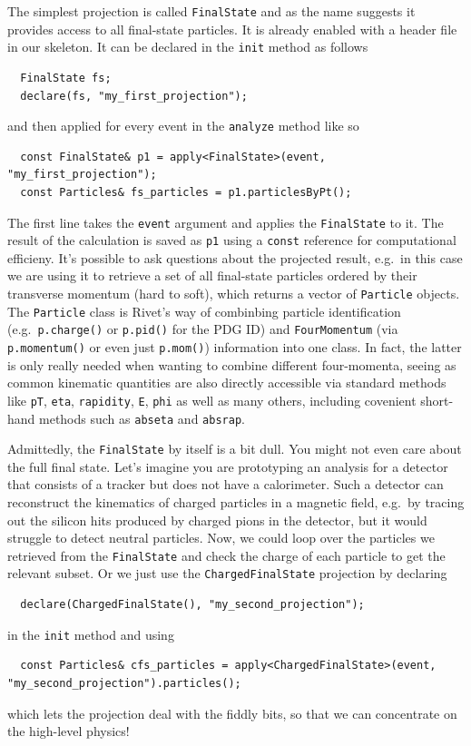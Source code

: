 \documentclass[10pt,fleqn]{scrartcl}
\theoremstyle{exstyle}
\begin{document}
The simplest projection is called
\verb|FinalState| and as the name suggests
it provides access to all final-state particles.
It is already enabled with a header file in our skeleton.
It can be declared in the \verb|init| method as follows
\begin{verbatim}
  FinalState fs;
  declare(fs, "my_first_projection");
\end{verbatim}
and then applied for every event in the \verb|analyze|
method like so
\begin{verbatim}
  const FinalState& p1 = apply<FinalState>(event, "my_first_projection");
  const Particles& fs_particles = p1.particlesByPt();
\end{verbatim}
The first line takes the \verb|event| argument and applies
the \verb|FinalState| to it. The result of the calculation
is saved as \verb|p1| using a \verb|const| reference
for computational efficieny. It's possible to ask questions
about the projected result, e.g.\ in this case
we are using it to retrieve a set of all final-state particles
ordered by their transverse momentum (hard to soft), which
returns a vector of \verb|Particle| objects. The \verb|Particle|
class is Rivet's way of combinbing particle identification
(e.g.\ \verb|p.charge()| or \verb|p.pid()| for the PDG ID)
and \verb|FourMomentum| (via \verb|p.momentum()| or even just \verb|p.mom()|)
information into one class.
In fact, the latter is only really needed when wanting to combine
different four-momenta, seeing as common kinematic quantities
are also directly accessible via standard methods like
\verb|pT|,
\verb|eta|,
\verb|rapidity|,
\verb|E|,
\verb|phi| as well as many others,
including covenient short-hand methods such as \verb|abseta| and \verb|absrap|.

Admittedly, the \verb|FinalState| by itself is a bit dull.
You might not even care about the full final state. Let's imagine you
are prototyping an analysis for a detector that consists of a tracker
but does not have a calorimeter. Such a detector
can reconstruct the kinematics of charged particles in
a magnetic field, e.g.\ by tracing out the silicon hits
produced by charged pions in the detector, but it would
struggle to detect neutral particles.
Now, we could loop over the particles we retrieved
from the \verb|FinalState| and
check the charge of each particle to get the relevant subset.
Or we just use the \verb|ChargedFinalState| projection by declaring
\begin{verbatim}
  declare(ChargedFinalState(), "my_second_projection");
\end{verbatim}
in the \verb|init| method and using
\begin{footnotesize}
\begin{verbatim}
  const Particles& cfs_particles = apply<ChargedFinalState>(event, "my_second_projection").particles();
\end{verbatim}
\end{footnotesize}
which lets the projection deal with the fiddly bits,
so that we can concentrate on the high-level physics!
\end{document}
